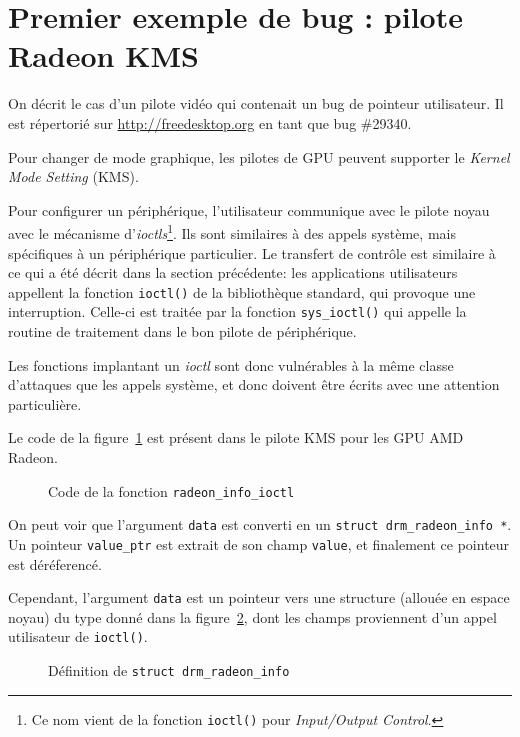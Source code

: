 \section{Premier exemple de bug : pilote Radeon KMS}

On décrit le cas d'un pilote vidéo qui contenait un bug de pointeur utilisateur.
Il est répertorié sur \url{http://freedesktop.org} en tant que bug \#29340.

Pour changer de mode graphique, les pilotes de GPU peuvent supporter le
\emph{Kernel Mode Setting} (KMS).

Pour configurer un périphérique, l'utilisateur communique avec le pilote noyau
avec le mécanisme d'\emph{ioctls}\footnote{
  Ce nom vient de la fonction \verb!ioctl()! pour
  \emph{Input/Output Control}.
}.
Ils sont similaires à des appels système, mais spécifiques à un périphérique
particulier. Le transfert de contrôle est similaire à ce qui a été décrit dans
la section précédente: les applications utilisateurs appellent la fonction
\texttt{ioctl()} de la bibliothèque standard, qui provoque une interruption.
Celle-ci est traitée par la fonction \texttt{sys\_ioctl()} qui appelle la
routine de traitement dans le bon pilote de périphérique.

Les fonctions implantant un \emph{ioctl} sont donc vulnérables à la
même classe d'attaques que les appels système, et donc doivent être écrits avec
une attention particulière.

Le code de la figure~\ref{fig:kms-buggy} est présent dans le pilote KMS pour les
GPU AMD Radeon.

\begin{figure}[h]
\caption{Code de la fonction \texttt{radeon\_info\_ioctl}}
\label{fig:kms-buggy}
\end{figure}

On peut voir que l'argument \texttt{data} est converti en un \texttt{struct
drm\_radeon\_info *}. Un pointeur \texttt{value\_ptr} est extrait de son champ
\texttt{value}, et finalement ce pointeur est déréferencé.

Cependant, l'argument \texttt{data} est un pointeur vers une structure (allouée
en espace noyau) du type donné dans la figure~\ref{fig:kms-info}, dont les
champs proviennent d'un appel utilisateur de \verb!ioctl()!.

\begin{figure}[h]
\caption{Définition de \texttt{struct drm\_radeon\_info}}
\label{fig:kms-info}
\end{figure}

